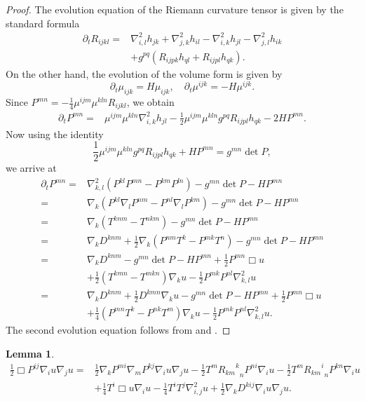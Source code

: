 \documentclass{amsart}
\newtheorem{lemma}[theorem]{Lemma}
\theoremstyle{definition}
\theoremstyle{remark}
\numberwithin{equation}{section}
\begin{document}
\begin{proof}
The evolution equation of the Riemann curvature tensor is given by the standard formula
\begin{align*}
\partial_t R_{ijkl}=&\nabla^2_{i,l}h_{jk}+\nabla^2_{j,k}h_{il}-\nabla^2_{i,k}h_{jl}-\nabla^2_{j,l}h_{ik}\\
&+g^{pq}(R_{ijpk}h_{ql}+R_{ijpl}h_{qk}).
\end{align*}
On the other hand, the evolution of the volume form is given by $$\partial_t\mu_{ijk}=H\mu_{ijk},\quad\partial_t\mu^{ijk}=-H\mu^{ijk}.$$
Since $P^{mn}=-\frac{1}{4}\mu^{ijm}\mu^{kln}R_{ijkl}$, we obtain
\begin{align*}
\partial_tP^{mn}=&\mu^{ijm}\mu^{kln}\nabla^2_{i,k}h_{jl}-\frac{1}{2}\mu^{ijm}\mu^{kln}g^{pq}R_{ijpl}h_{qk}-2HP^{mn}.
\end{align*}
Now using the identity
\[\frac{1}{2}\mu^{ijm}\mu^{kln}g^{pq}R_{ijpl}h_{qk}+HP^{mn}=g^{mn}\det P,\]
we arrive at
\begin{align*}
\partial_tP^{mn}=&\nabla^2_{k,l}(P^{kl}P^{mn}-P^{km}P^{ln})-g^{mn}\det P-HP^{mn}\\
=&\nabla_k(P^{kl}\nabla_lP^{nm}-P^{nl}\nabla_lP^{km})-g^{mn}\det P-HP^{mn}\\
=&\nabla_k\left(T^{knm}-T^{nkm}\right)-g^{mn}\det P-HP^{mn}\\
=&\nabla_kD^{knm}+\frac{1}{2}\nabla_k\left(P^{nm}T^k-P^{mk}T^n\right)-g^{mn}\det P-HP^{mn}\\
=&\nabla_kD^{knm}-g^{mn}\det P-HP^{mn}+\frac{1}{2}P^{mn}\Box u\\
&+\frac{1}{2}\left(T^{kmn}-T^{mkn}\right)\nabla_ku-\frac{1}{2}P^{mk}P^{nl}\nabla^2_{k,l}u\\
=&\nabla_kD^{knm}+\frac{1}{2}D^{kmn}\nabla_ku-g^{mn}\det P-HP^{mn}+\frac{1}{2}P^{mn}\Box u\\
&+\frac{1}{4}\left(P^{mn}T^k-P^{nk}T^m\right)\nabla_ku-\frac{1}{2}P^{mk}P^{nl}\nabla^2_{k,l}u.
\end{align*}
The second evolution equation follows from \cite[Prop. 9]{Chowcross2002} and  \cite[Equ. (4)]{Chowcross2002}.
\end{proof}
\begin{lemma}
\begin{align*}
\frac{1}{2}\Box P^{ij}\nabla_iu\nabla_ju=&\frac{1}{2}\nabla_kP^{mi}\nabla_mP^{kj}\nabla_iu\nabla_ju-\frac{1}{2}T^m{{R_{km}}^k}_nP^{ni}\nabla_iu-\frac{1}{2}T^m{{R_{km}}^i}_nP^{kn}\nabla_iu\\
&+\frac{1}{4}T^i\Box u\nabla_iu-\frac{1}{4}T^iT^j\nabla^2_{i,j}u+\frac{1}{2}\nabla_k D^{kij}\nabla_iu\nabla_ju.
\end{align*}
\end{lemma}
\end{document}
